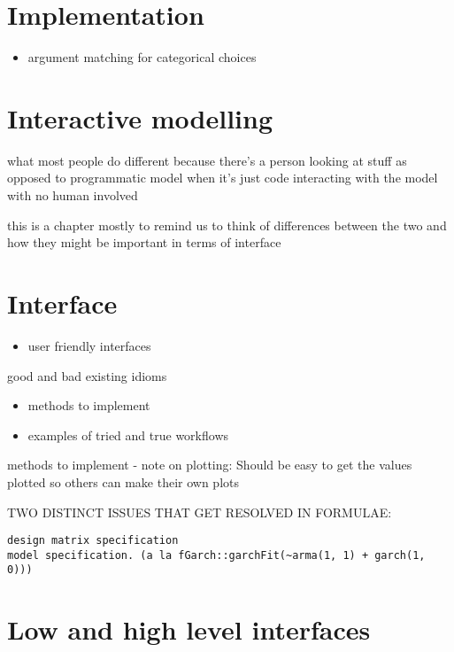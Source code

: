 \documentclass[]{book}
\providecommand{\tightlist}{%
  \setlength{\itemsep}{0pt}\setlength{\parskip}{0pt}}
\theoremstyle{definition}
\theoremstyle{definition}
\theoremstyle{definition}
\theoremstyle{remark}
\begin{document}
\chapter{Implementation}\label{implementation}

\begin{itemize}
\tightlist
\item
  argument matching for categorical choices
\end{itemize}

\chapter{Interactive modelling}\label{interactive-modelling}

what most people do different because there's a person looking at stuff
as opposed to programmatic model when it's just code interacting with
the model with no human involved

this is a chapter mostly to remind us to think of differences between
the two and how they might be important in terms of interface

\chapter{Interface}\label{interface}

\begin{itemize}
\tightlist
\item
  user friendly interfaces
\end{itemize}

good and bad existing idioms

\begin{itemize}
\tightlist
\item
  methods to implement
\item
  examples of tried and true workflows
\end{itemize}

methods to implement - note on plotting: Should be easy to get the
values plotted so others can make their own plots

TWO DISTINCT ISSUES THAT GET RESOLVED IN FORMULAE:

\begin{verbatim}
design matrix specification
model specification. (a la fGarch::garchFit(~arma(1, 1) + garch(1, 0)))
\end{verbatim}

\chapter{Low and high level
interfaces}\label{low-and-high-level-interfaces}
\end{document}
